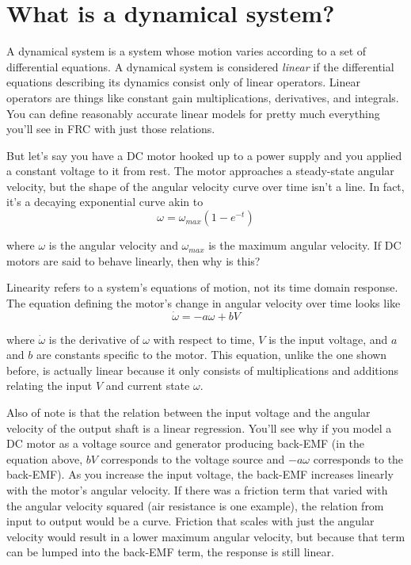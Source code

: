 \section{What is a dynamical system?}

A dynamical system is a \gls{system} whose motion varies according to a set of
differential equations. A dynamical system is considered \textit{linear} if the
differential equations describing its dynamics consist only of linear operators.
Linear operators are things like constant gain multiplications, derivatives, and
integrals. You can define reasonably accurate linear \glspl{model} for pretty
much everything you'll see in FRC with just those relations.

But let's say you have a DC motor hooked up to a power supply and you applied a
constant voltage to it from rest. The motor approaches a steady-state angular
velocity, but the shape of the angular velocity curve over time isn't a line. In
fact, it's a decaying exponential curve akin to
\begin{equation*}
  \omega = \omega_{max}\left(1 - e^{-t}\right)
\end{equation*}

where $\omega$ is the angular velocity and $\omega_{max}$ is the maximum angular
velocity. If DC motors are said to behave linearly, then why is this?

Linearity refers to a \gls{system}'s equations of motion, not its time domain
response. The equation defining the motor's change in angular velocity over time
looks like
\begin{equation*}
  \dot{\omega} = -a\omega + bV
\end{equation*}

where $\dot{\omega}$ is the derivative of $\omega$ with respect to time, $V$ is
the input voltage, and $a$ and $b$ are constants specific to the motor. This
equation, unlike the one shown before, is actually linear because it only
consists of multiplications and additions relating the \gls{input} $V$ and
current \gls{state} $\omega$.

Also of note is that the relation between the input voltage and the angular
velocity of the output shaft is a linear regression. You'll see why if you model
a DC motor as a voltage source and generator producing back-EMF (in the equation
above, $bV$ corresponds to the voltage source and $-a\omega$ corresponds to the
back-EMF). As you increase the input voltage, the back-EMF increases linearly
with the motor's angular velocity. If there was a friction term that varied with
the angular velocity squared (air resistance is one example), the relation from
input to output would be a curve. Friction that scales with just the angular
velocity would result in a lower maximum angular velocity, but because that term
can be lumped into the back-EMF term, the response is still linear.
